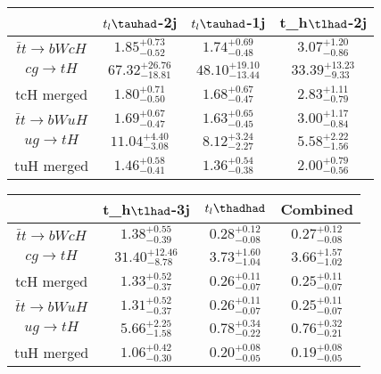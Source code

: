 \centering
\begin{tabular}{|c|c|c|c|} \hline
 & $t_l\tauhad$-2j & $t_l\tauhad$-1j & t_h$\tlhad$-2j\\\hline
$\bar{t}t\to bWcH$ & $1.85^{+0.73}_{-0.52}$ & $1.74^{+0.69}_{-0.48}$ & $3.07^{+1.20}_{-0.86}$\\\hline
$cg\to tH$ & $67.32^{+26.76}_{-18.81}$ & $48.10^{+19.10}_{-13.44}$ & $33.39^{+13.23}_{-9.33}$\\\hline
tcH merged & $1.80^{+0.71}_{-0.50}$ & $1.68^{+0.67}_{-0.47}$ & $2.83^{+1.11}_{-0.79}$\\\hline
$\bar{t}t\to bWuH$ & $1.69^{+0.67}_{-0.47}$ & $1.63^{+0.65}_{-0.45}$ & $3.00^{+1.17}_{-0.84}$\\\hline
$ug\to tH$ & $11.04^{+4.40}_{-3.08}$ & $8.12^{+3.24}_{-2.27}$ & $5.58^{+2.22}_{-1.56}$\\\hline
tuH merged & $1.46^{+0.58}_{-0.41}$ & $1.36^{+0.54}_{-0.38}$ & $2.00^{+0.79}_{-0.56}$\\\hline
\end{tabular}
\begin{tabular}{|c|c|c|c|} \hline
 & t_h$\tlhad$-3j & $t_l\thadhad$ & Combined\\\hline
$\bar{t}t\to bWcH$ & $1.38^{+0.55}_{-0.39}$ & $0.28^{+0.12}_{-0.08}$ & $0.27^{+0.12}_{-0.08}$\\\hline
$cg\to tH$ & $31.40^{+12.46}_{-8.78}$ & $3.73^{+1.60}_{-1.04}$ & $3.66^{+1.57}_{-1.02}$\\\hline
tcH merged & $1.33^{+0.52}_{-0.37}$ & $0.26^{+0.11}_{-0.07}$ & $0.25^{+0.11}_{-0.07}$\\\hline
$\bar{t}t\to bWuH$ & $1.31^{+0.52}_{-0.37}$ & $0.26^{+0.11}_{-0.07}$ & $0.25^{+0.11}_{-0.07}$\\\hline
$ug\to tH$ & $5.66^{+2.25}_{-1.58}$ & $0.78^{+0.34}_{-0.22}$ & $0.76^{+0.32}_{-0.21}$\\\hline
tuH merged & $1.06^{+0.42}_{-0.30}$ & $0.20^{+0.08}_{-0.05}$ & $0.19^{+0.08}_{-0.05}$\\\hline
\end{tabular}
